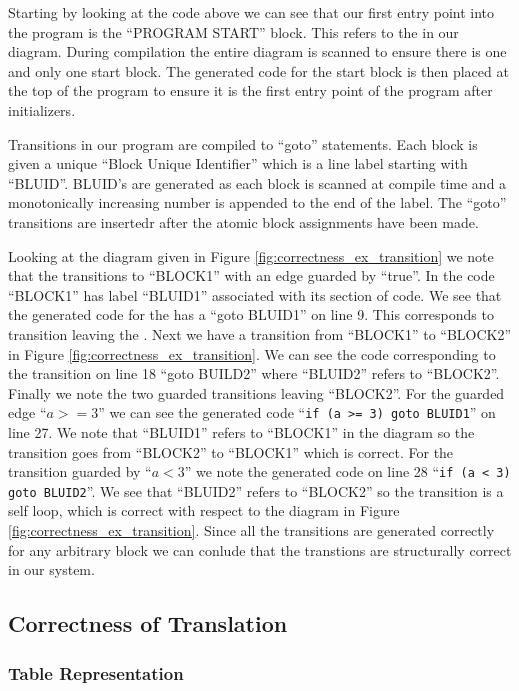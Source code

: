 Starting by looking at the code above we can see that our first entry point into the program is the ``PROGRAM START'' block. This refers to the  in our diagram. During compilation the entire diagram is scanned to ensure there is one and only one start block. The generated code for the start block is then placed at the top of the program to ensure it is the first entry point of the program after initializers. 

Transitions in our program are compiled to ``goto'' statements. Each block is given a unique ``Block Unique Identifier'' which is a line label starting with ``BLUID''. BLUID's are generated as each block is scanned at compile time and a monotonically increasing number is appended to the end of the label. The ``goto'' transitions are insertedr after the atomic block assignments have been made.

Looking at the diagram given in Figure \ref{fig:correctness_ex_transition} we note that the  transitions to ``BLOCK1'' with an edge guarded by ``true''. In the code ``BLOCK1'' has label ``BLUID1'' associated with its section of code. We see that the generated code for the  has a ``goto BLUID1'' on line 9. This corresponds to transition leaving the . Next we have a transition from ``BLOCK1'' to ``BLOCK2'' in Figure \ref{fig:correctness_ex_transition}. We can see the code corresponding to the transition on line 18 ``goto BUILD2'' where ``BLUID2'' refers to ``BLOCK2''. Finally we note the two guarded transitions leaving ``BLOCK2''. For the guarded edge ``$a >= 3$'' we can see the generated code ``\texttt{if (a >= 3) goto BLUID1}'' on line 27. We note that ``BLUID1'' refers to ``BLOCK1'' in the diagram so the transition goes from ``BLOCK2'' to ``BLOCK1'' which is correct. For the transition guarded by ``$a < 3$'' we note the generated code on line 28 ``\texttt{if (a < 3) goto BLUID2}''. We see that ``BLUID2'' refers to ``BLOCK2'' so the transition is a self loop, which is correct with respect to the diagram in Figure \ref{fig:correctness_ex_transition}. Since all the transitions are generated correctly for any arbitrary block we can conlude that the transtions are structurally correct in our system.


\clearpage
\subsection{Correctness of Translation}

\subsubsection{Table Representation}

